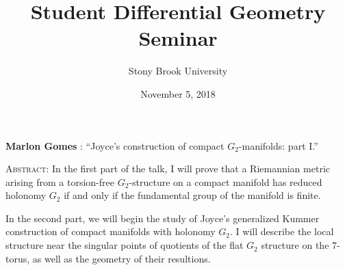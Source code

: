 \documentclass[11pt]{article}
\title{Student Differential Geometry Seminar}
\author{Stony Brook University}
\date{November 5, 2018}
\makeatletter
\newcommand{\spe@ker}{}
\newcommand{\t@lktitle}{}
\newcommand{\@ffili@tion}{}
\newcommand{\speaker}[1]{%
  \renewcommand{\spe@ker}{#1}}
\newcommand{\talktitle}[1]{%
  \renewcommand{\t@lktitle}{#1}}
\newcommand{\affiliation}[1]{%
  \renewcommand{\@ffili@tion}{#1}}
\renewenvironment{abstract}{%
  \begin{center}
    \large
    \textbf{\spe@ker} %
    : ``\t@lktitle''
  \end{center}
  \begin{trivlist}
  \item\textsc{Abstract:}}{%
  \end{trivlist}}
\makeatother
\begin{document}
\maketitle
\thispagestyle{empty}

\speaker{Marlon Gomes}
\talktitle{Joyce's construction of compact $G_2$-manifolds: part I.}

\begin{abstract}
In the first part of the talk, I will prove that a Riemannian metric arising from a torsion-free $G_2$-structure on a compact manifold has reduced holonomy $G_2$ if and only if the fundamental group of the manifold is finite. 

In the second part, we will begin the study of Joyce's generalized Kummer construction of compact manifolds with holonomy $G_2$. I will describe the local structure near the singular points of quotients of the flat $G_2$ structure on the $7$-torus, as well as the geometry of their resultions. 
\end{abstract}
\end{document}
